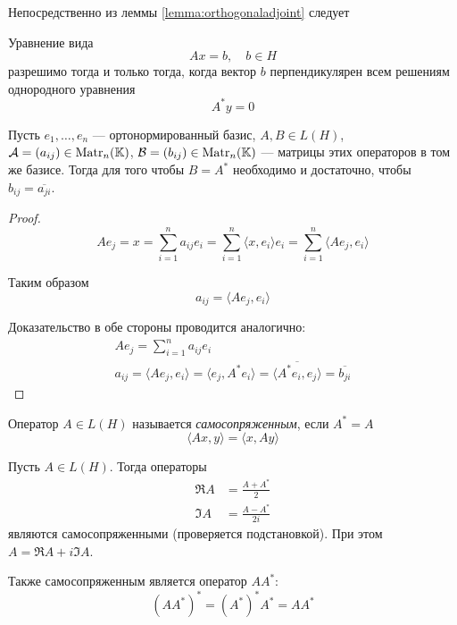 Непосредственно из леммы \ref{lemma:orthogonaladjoint} следует
\begin{theorem}[Фредгольма]
    Уравнение вида
    \[ Ax = b, \quad b \in H \]
    разрешимо тогда и только тогда, когда вектор $b$ перпендикулярен всем
    решениям однородного уравнения
    \[ A^*y = 0 \]
\end{theorem}

\begin{lemma}\label{lemma:adjointmatrix}
    Пусть $e_1, \dotsc, e_n$ — ортонормированный базис, $A, B \in L(H)$,
    $\mathcal{A} = (a_{ij}) \in \mathrm{Matr}_{n}({\mathbb{K}})$, $\mathcal{B} = (b_{ij}) \in \mathrm{Matr}_{n}({\mathbb{K}})$
    — матрицы этих операторов в том же базисе. Тогда для того чтобы $B = A^*$
    необходимо и достаточно, чтобы $b_{ij} = \overline{a_{ji}}$.
\end{lemma}

\begin{proof}
    \[ Ae_j = x = \sum_{i=1}^n a_{ij}e_i = \sum_{i=1}^n \langle x, e_i\rangle
    e_i = \sum_{i=1}^n \langle Ae_j, e_i \rangle \]

    Таким образом 
    \[ a_{ij} = \langle Ae_j, e_i\rangle \]

    Доказательство в обе стороны проводится аналогично:
    \begin{gather*}
            Ae_j = \sum_{i=1}^n a_{ij} e_i \\
            a_{ij} = \langle Ae_j, e_i \rangle = \langle e_j, A^* e_i\rangle =
            \overline{\langle A^* e_i, e_j\rangle} = \overline{b_{ji}}
    \end{gather*}
\end{proof}

\begin{definition}
    Оператор $A\in L(H)$ называется \emph{самосопряженным}, если $A^* = A$
    \[ \langle Ax, y\rangle = \langle x, Ay\rangle \]
\end{definition}

\begin{example}
    Пусть $A\in L(H)$. Тогда операторы
    \begin{align*}
        \Re A &= \frac{A + A^*}{2} \\
        \Im A &= \frac{A - A^*}{2i}
    \end{align*}
    являются самосопряженными (проверяется подстановкой).
    При этом $A = \Re A + i \Im A$.
\end{example}

\begin{example}
    Также самосопряженным является оператор $AA^*$:
    \[ (AA^*)^* = (A^*)^* A^* = AA^* \]
\end{example}

